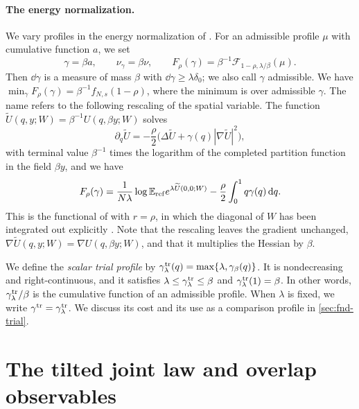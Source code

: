 \paragraph{The energy normalization.}
We vary profiles in the energy normalization of
\cite[Section~7.1]{AL}. For an admissible profile $\mu$ with cumulative
function $a$, we set
\[
 \gamma=\beta a,\qquad \nu_\gamma=\beta\nu,\qquad
 F_\rho(\gamma)=\beta^{-1}\mathcal F_{1-\rho,\lambda/\beta}(\mu).
\]
Then $\dd\gamma$ is a measure of mass $\beta$ with
$\dd\gamma\ge\lambda\delta_0$; we also call $\gamma$ admissible. We
have $\min_\gamma F_\rho(\gamma)=\beta^{-1}f_{N,s}(1-\rho)$, where the
minimum is over admissible $\gamma$. The name refers to the following
rescaling of the spatial variable. The function
$\widetilde U(q,y;W)=\beta^{-1}U(q,\beta y;W)$ solves
\[
 \partial_q\widetilde U
 =-\frac\rho2\bigl(\Delta\widetilde U+\gamma(q)|\nabla\widetilde U|^2\bigr),
\]
with terminal value $\beta^{-1}$ times the logarithm of the completed
partition function in the field $\beta y$, and we have
\[
 F_\rho(\gamma)=\frac1{N\lambda}\log\mathbb E_{\rm ref}
     e^{\lambda\widetilde U(0,0;W)}
 -\frac\rho2\int_0^1q\gamma(q)\,\mathrm d q .
\]
This is the functional of \cite[(7.2)]{AL} with $r=\rho$, in which the
diagonal of $W$ has been integrated out explicitly
\cite[Section~7.1]{AL}. Note that the rescaling leaves the gradient unchanged,
$\nabla\widetilde U(q,y;W)=\nabla U(q,\beta y;W)$, and that it multiplies
the Hessian by $\beta$.

We define the \emph{scalar trial profile} by
$\gamma^{\rm tr}_\lambda(q)=\max\{\lambda,\gamma_\beta(q)\}$. It is
nondecreasing and right-continuous, and it satisfies
$\lambda\le\gamma^{\rm tr}_\lambda\le\beta$ and
$\gamma^{\rm tr}_\lambda(1)=\beta$. In other words,
$\gamma^{\rm tr}_\lambda/\beta$ is the cumulative function of an
admissible profile. When $\lambda$ is
fixed, we write $\gamma^{\rm tr}=\gamma^{\rm tr}_\lambda$. We discuss its
cost and its use as a comparison profile in
\cref{sec:fnd-trial}.

\section{The tilted joint law and overlap observables}
\label{subsec:fnd-law}

